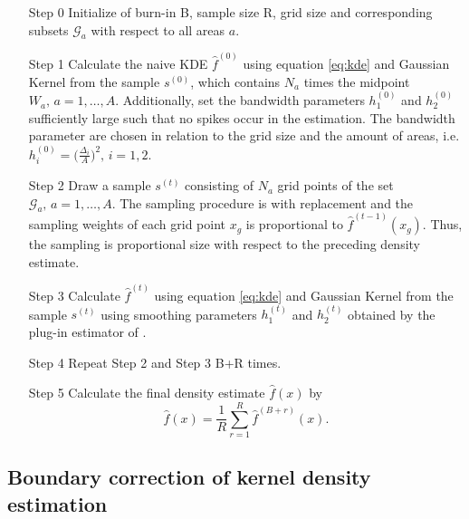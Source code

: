 \begin{itemize}
    \item[Step 0] Initialize of burn-in B, sample size R, grid size and corresponding subsets $\mathcal{G}_a$ with respect to all areas $a$.
    \item[Step 1] Calculate the naive KDE $\hat{f}^{(0)}$ using equation \ref{eq:kde} and Gaussian Kernel from the sample $s^{(0)}$, which contains $N_a$ times the midpoint $W_a,\, a = 1,\dots, A$. Additionally, set the bandwidth parameters $h_1^{(0)}$ and $h_2^{(0)}$ sufficiently large such that no spikes occur in the estimation. 
    The bandwidth parameter are chosen in relation to the grid size and the amount of areas, i.e. $h_i^{(0)} = \Big( \frac{\Delta_i}{A} \Big)^2, \, i = 1,2$.  
    \item[Step 2] Draw a sample $s^{(t)}$ consisting of $N_a$ grid points of the set $\mathcal{G}_a,\, a = 1, \dots, A$. The sampling procedure is with replacement and the sampling weights of each grid point $x_g$ is proportional to $\hat{f}^{(t-1)}(x_g)$. Thus, the sampling is proportional size with respect to the preceding density estimate.
    \item[Step 3] Calculate $\hat{f}^{(t)}$ using equation \ref{eq:kde} and Gaussian Kernel from the sample $s^{(t)}$ using smoothing parameters $h_1^{(t)}$ and $h_2^{(t)}$ obtained by the plug-in estimator of \cite{Wand94}. 
    \item[Step 4] Repeat Step 2 and Step 3 B+R times. 
    \item[Step 5] Calculate the final density estimate $\hat{f}(x)$ by
    $$ \hat{f}(x) = \frac{1}{R} \sum_{r = 1}^R \hat{f}^{(B+r)}(x).$$
\end{itemize}



\hypertarget{Boundary-correction-of-kernel-density-estimation}{%
\subsection{Boundary correction of kernel density estimation}\label{Boundary-correction-of-kernel-density-estimation}}

